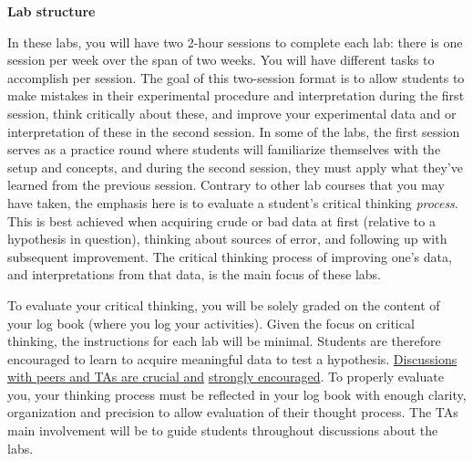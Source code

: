\documentclass[12pt]{report}
\begin{document}

\noindent \large \textbf{Lab structure} \normalsize

In these labs, you will have two 2-hour sessions to complete each lab: there is one session per week over the span of two weeks. 
You will have different tasks to accomplish per session. The goal of this two-session format is to allow students to make mistakes in their experimental procedure and interpretation during the first session, think critically about these, and improve your experimental data and or interpretation of these in the second session. 
In some of the labs, the first session  serves as a practice round where students will familiarize themselves with the setup and concepts, and during the second session, they must apply what they've learned from the previous session.
Contrary to other lab courses that you may have taken, the emphasis here is to evaluate a student's critical thinking \textit{process}. This is best achieved when acquiring crude or bad data at first (relative to a hypothesis  in question), thinking about sources of error, and following up with subsequent improvement. 
The critical thinking process of improving one's data, and interpretations from that data, is the main focus of these labs.

To evaluate your critical thinking, you will be solely graded on the content of your log book (where you log your activities).
Given the focus on critical thinking, the instructions for each lab will be minimal. 
Students are therefore encouraged to learn to acquire meaningful data to test a hypothesis. \underline{Discussions with peers and TAs are crucial and} \underline{strongly encouraged}. 
To properly evaluate you, your thinking process must  be reflected in your log book with enough clarity, organization and precision to allow  evaluation of their thought process. The TAs main involvement will be to guide students throughout discussions  about the labs. 
\end{document}
